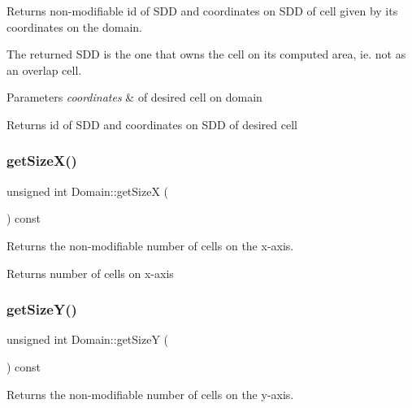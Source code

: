 Returns non-\/modifiable id of S\+DD and coordinates on S\+DD of cell given by its coordinates on the domain. 

The returned S\+DD is the one that owns the cell on its computed area, ie. not as an overlap cell.


\begin{DoxyParams}{Parameters}
{\em coordinates} & of desired cell on domain\\
\hline
\end{DoxyParams}
\begin{DoxyReturn}{Returns}
id of S\+DD and coordinates on S\+DD of desired cell 
\end{DoxyReturn}
\mbox{\label{classDomain_a75f299e3871fe9cec01637b140429ef9}} 
\subsubsection{\texorpdfstring{get\+Size\+X()}{getSizeX()}}
{\footnotesize\ttfamily unsigned int Domain\+::get\+SizeX (\begin{DoxyParamCaption}{ }\end{DoxyParamCaption}) const\hspace{0.3cm}{\ttfamily [inline]}}



Returns the non-\/modifiable number of cells on the x-\/axis. 

\begin{DoxyReturn}{Returns}
number of cells on x-\/axis 
\end{DoxyReturn}
\mbox{\label{classDomain_a66692b4f23353c9b1fe884e583770cb3}} 
\subsubsection{\texorpdfstring{get\+Size\+Y()}{getSizeY()}}
{\footnotesize\ttfamily unsigned int Domain\+::get\+SizeY (\begin{DoxyParamCaption}{ }\end{DoxyParamCaption}) const\hspace{0.3cm}{\ttfamily [inline]}}



Returns the non-\/modifiable number of cells on the y-\/axis. 

